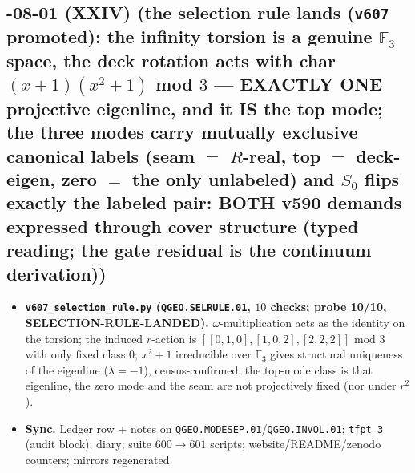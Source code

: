 \subsection*{-08-01 (XXIV) (the selection rule lands (\texttt{v607} promoted): the infinity torsion is a genuine $\mathbb{F}_3$ space, the deck rotation acts with char $(x+1)(x^2+1)$ mod $3$ --- EXACTLY ONE projective eigenline, and it IS the top mode; the three modes carry mutually exclusive canonical labels (seam $=$ $R$-real, top $=$ deck-eigen, zero $=$ the only unlabeled) and $S_0$ flips exactly the labeled pair: BOTH v590 demands expressed through cover structure (typed reading; the gate residual is the continuum derivation))}
\begin{itemize}[leftmargin=1.5em]
\item \textbf{\texttt{v607\_selection\_rule.py} (\texttt{QGEO.SELRULE.01}, $10$ checks; probe
10/10, SELECTION-RULE-LANDED).} $\omega$-multiplication acts as the identity on the torsion;
the induced $r$-action is $[[0,1,0],[1,0,2],[2,2,2]]$ mod $3$ with only fixed class $0$;
$x^2+1$ irreducible over $\mathbb{F}_3$ gives structural uniqueness of the eigenline
($\lambda=-1$), census-confirmed; the top-mode class is that eigenline, the zero mode and
the seam are not projectively fixed (nor under $r^2$).
\item \textbf{Sync.} Ledger row + notes on
\texttt{QGEO.MODESEP.01}/\texttt{QGEO.INVOL.01}; \texttt{tfpt\_3} (audit block); diary;
suite $600\to601$ scripts; website/README/zenodo counters; mirrors regenerated.
\end{itemize}

